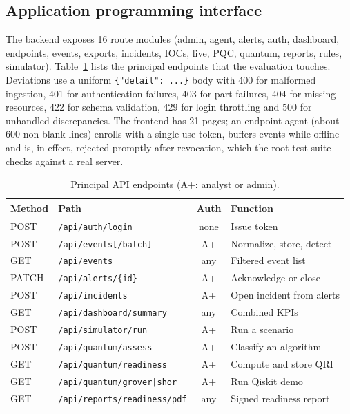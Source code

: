 \documentclass[conference]{IEEEtran}
\newcommand{\code}[1]{\texttt{#1}}
\begin{document}
\subsection{Application programming interface}
The backend exposes 16 route modules (admin, agent, alerts, auth, dashboard, endpoints, events, exports, incidents, IOCs, live, PQC, quantum, reports, rules, simulator). Table~\ref{tab:api} lists the principal endpoints that the evaluation touches. Deviations use a uniform \code{\{"detail": ...\}} body with 400 for malformed ingestion, 401 for authentication failures, 403 for part failures, 404 for missing resources, 422 for schema validation, 429 for login throttling and 500 for unhandled discrepancies. The frontend has 21 pages; an endpoint agent (about 600 non-blank lines) enrolls with a single-use token, buffers events while offline and is, in effect, rejected promptly after revocation, which the root test suite checks against a real server.

\begin{table}[t]
\caption{Principal API endpoints (A+: analyst or admin).}
\label{tab:api}
\centering
\scriptsize
\setlength{\tabcolsep}{3pt}
\begin{tabular}{@{}l l c p{2.2cm}@{}}
\toprule
Method & Path & Auth & Function \\
\midrule
POST  & \code{/api/auth/login} & none & Issue token \\
POST  & \code{/api/events[/batch]} & A+ & Normalize, store, detect \\
GET   & \code{/api/events} & any & Filtered event list \\
PATCH & \code{/api/alerts/\{id\}} & A+ & Acknowledge or close \\
POST  & \code{/api/incidents} & A+ & Open incident from alerts \\
GET   & \code{/api/dashboard/summary} & any & Combined KPIs \\
POST  & \code{/api/simulator/run} & A+ & Run a scenario \\
POST  & \code{/api/quantum/assess} & A+ & Classify an algorithm \\
GET   & \code{/api/quantum/readiness} & A+ & Compute and store QRI \\
GET   & \code{/api/quantum/grover|shor} & A+ & Run Qiskit demo \\
GET   & \code{/api/reports/readiness/pdf} & any & Signed readiness report \\
\bottomrule
\end{tabular}
\end{table}
\end{document}
